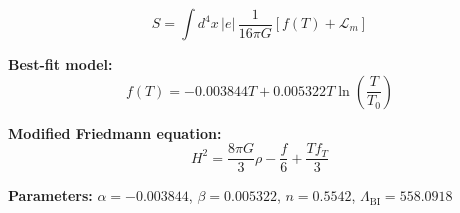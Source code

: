 
\begin{equation}
  S = \int d^4x \, |e| \, \frac{1}{16\pi G} \left[ f(T) + \mathcal{L}_m \right]
\end{equation}

\textbf{Best-fit model:}
\begin{equation}
  f(T) = -0.003844 T + 0.005322 T \ln\!\left(\frac{T}{T_0}\right)
\end{equation}

\textbf{Modified Friedmann equation:}
\begin{equation}
  H^2 = \frac{8\pi G}{3} \rho - \frac{f}{6} + \frac{T f_T}{3}
\end{equation}

\textbf{Parameters:}
$\alpha = -0.003844$, \quad
$\beta = 0.005322$, \quad
$n = 0.5542$, \quad
$\Lambda_{\text{BI}} = 558.0918$